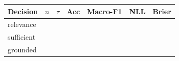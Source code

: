 \begin{tabular}{lcccccc}
\toprule
\textbf{Decision} & $n$ & $\tau$ & \textbf{Acc} & \textbf{Macro-F1} & \textbf{NLL} & \textbf{Brier} \\
\midrule
relevance & \ph{--} & \ph{--} & \ph{--} & \ph{--} & \ph{--} & \ph{--} \\
sufficient & \ph{--} & \ph{--} & \ph{--} & \ph{--} & \ph{--} & \ph{--} \\
grounded & \ph{--} & \ph{--} & \ph{--} & \ph{--} & \ph{--} & \ph{--} \\
\bottomrule
\end{tabular}
